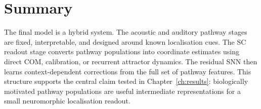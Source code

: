 \section{Summary}

The final model is a hybrid system. The acoustic and auditory pathway stages are fixed, interpretable, and designed around known localisation cues. The SC readout stage converts pathway populations into coordinate estimates using direct COM, calibration, or recurrent attractor dynamics. The residual SNN then learns context-dependent corrections from the full set of pathway features. This structure supports the central claim tested in Chapter~\ref{ch:results}: biologically motivated pathway populations are useful intermediate representations for a small neuromorphic localisation readout.
